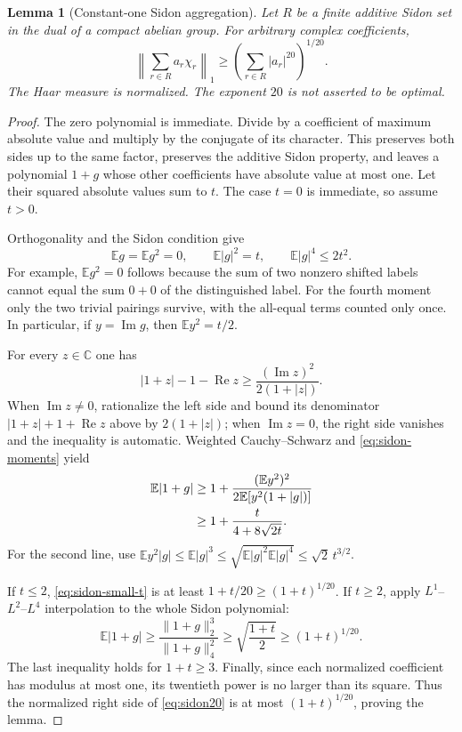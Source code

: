 \documentclass[11pt,reqno]{amsart}
\numberwithin{equation}{section}
\newtheorem{lemma}[theorem]{Lemma}
\theoremstyle{definition}
\theoremstyle{remark}
\newcommand{\C}{\mathbb C}
\newcommand{\E}{\mathbb E}
\newcommand{\norm}[1]{\lVert#1\rVert}
\DeclareMathOperator{\Rea}{Re}
\DeclareMathOperator{\Ima}{Im}
\begin{document}
\begin{lemma}[Constant-one Sidon aggregation]\label{lem:sidon20}
Let $R$ be a finite additive Sidon set in the dual of a compact abelian
group. For arbitrary complex coefficients,
\begin{equation}\label{eq:sidon20}
 \left\|\sum_{r\in R}a_r\chi_r\right\|_1
 \ge\left(\sum_{r\in R}|a_r|^{20}\right)^{1/20}.
\end{equation}
The Haar measure is normalized. The exponent $20$ is not asserted to
be optimal.
\end{lemma}
\begin{proof}
The zero polynomial is immediate. Divide by a coefficient of maximum
absolute value and multiply by the conjugate of its character. This
preserves both sides up to the same factor, preserves the additive
Sidon property, and leaves a polynomial $1+g$ whose other coefficients
have absolute value at most one. Let their squared absolute values
sum to $t$. The case $t=0$ is immediate, so assume $t>0$.

Orthogonality and the Sidon condition give
\begin{equation}\label{eq:sidon-moments}
 \E g=\E g^2=0,\qquad
 \E|g|^2=t,\qquad \E|g|^4\le2t^2.
\end{equation}
For example, $\E g^2=0$ follows because the sum of two nonzero shifted
labels cannot equal the sum $0+0$ of the distinguished label. For the
fourth moment only the two trivial pairings survive, with the all-equal
terms counted only once. In particular, if $y=\Ima g$, then
$\E y^2=t/2$.

For every $z\in\C$ one has
\begin{equation}\label{eq:pointwise-excess}
 |1+z|-1-\Rea z\ge\frac{(\Ima z)^2}{2(1+|z|)}.
\end{equation}
When $\Ima z\ne0$, rationalize the left side and bound its denominator
$|1+z|+1+\Rea z$ above by $2(1+|z|)$; when $\Ima z=0$, the right
side vanishes and the inequality is automatic. Weighted
Cauchy--Schwarz and \eqref{eq:sidon-moments} yield
\begin{align}
 \E|1+g|
 &\ge1+\frac{(\E y^2)^2}{2\E[y^2(1+|g|)]}\notag\\
 &\ge1+\frac{t}{4+8\sqrt{2t}}.
 \label{eq:sidon-small-t}
\end{align}
For the second line, use
$\E y^2|g|\le\E|g|^3\le\sqrt{\E|g|^2\E|g|^4}
\le\sqrt2\,t^{3/2}$.

If $t\le2$, \eqref{eq:sidon-small-t} is at least
$1+t/20\ge(1+t)^{1/20}$. If $t\ge2$, apply $L^1$--$L^2$--$L^4$
interpolation to the whole Sidon polynomial:
\[
 \E|1+g|\ge
 \frac{\norm{1+g}_2^3}{\norm{1+g}_4^2}
 \ge\sqrt{\frac{1+t}{2}}
 \ge(1+t)^{1/20}.
\]
The last inequality holds for $1+t\ge3$. Finally, since each
normalized coefficient has modulus at most one, its twentieth power
is no larger than its square. Thus the normalized right side of
\eqref{eq:sidon20} is at most $(1+t)^{1/20}$, proving the lemma.
\end{proof}
\end{document}
